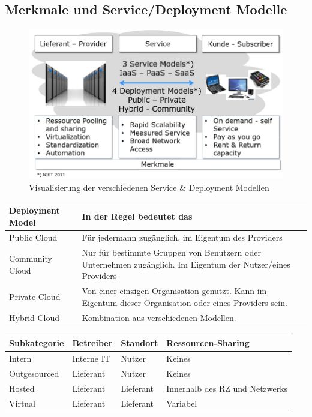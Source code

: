 \documentclass[a4paper, 11pt]{article}
\renewcommand*{\thead}[1]{\bfseries #1}
\begin{document}
\newpage

\subsection{Merkmale und Service/Deployment Modelle}

\begin{figure}[htb]
	\centering
	\includegraphics[keepaspectratio=true,height=15\baselineskip]{merkmale_cloud.jpg}
	\caption{Visualisierung der verschiedenen Service \& Deployment Modellen}
	\label{fig:merkmale_cloud}
\end{figure}
\begin{center}
\begin{tabular}{|l|p{10cm}|}
	\hline 
	\thead{Deployment Model} & \thead{In der Regel bedeutet das} \\ 
	\hline 
	Public Cloud & Für jedermann zugänglich. im Eigentum des Providers \\ 
	\hline 
	Community Cloud & Nur für bestimmte Gruppen von Benutzern oder Unternehmen zugänglich. Im Eigentum der Nutzer/eines Providers \\ 
	\hline 
	Private Cloud & Von einer einzigen Organisation genutzt. Kann im Eigentum dieser Organisation oder eines Providers sein.  \\ 
	\hline 
	Hybrid Cloud & Kombination aus verschiedenen Modellen. \\ 
	\hline 
\end{tabular} 

\vspace{10px}


\begin{tabular}{|l|l|l|l|}
	\hline 
	\thead{Subkategorie} & \thead{Betreiber} & \thead{Standort} & \thead{Ressourcen-Sharing}\\ 
	\hline 
	Intern & Interne IT & Nutzer & Keines\\ 
	\hline 
	Outgesourced & Lieferant & Nutzer & Keines\\ 
	\hline 
	Hosted & Lieferant & Lieferant & Innerhalb des RZ und Netzwerks\\ 
	\hline 
	Virtual & Lieferant & Lieferant & Variabel\\ 
	\hline 
\end{tabular} 
\end{center}
\end{document}

